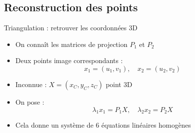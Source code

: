 \subsection{Reconstruction des points}
\begin{frame}{Triangulation : retrouver les coordonnées 3D}
\begin{minipage}[t]{0.48\textwidth}
  \vspace*{\fill}
  \begin{itemize}
    \item<1-> On connaît les matrices de projection \( P_1 \) et \( P_2 \)
    \item<2-> Deux points image correspondants :
    \[
      x_1 = (u_1, v_1),\quad x_2 = (u_2, v_2)
    \]
    \item<3-> Inconnue : \( X = (x_C, y_C, z_C) \) point 3D
    \item<4-> On pose :
    \[
      \lambda_1 x_1 = P_1 X,\quad \lambda_2 x_2 = P_2 X
    \]
    \item<5-> Cela donne un système de 6 équations linéaires homogènes
  \end{itemize}
  \vspace*{\fill}
\end{minipage}
\hfill
\begin{minipage}[t]{0.50\textwidth}
\end{minipage}
\end{frame}

